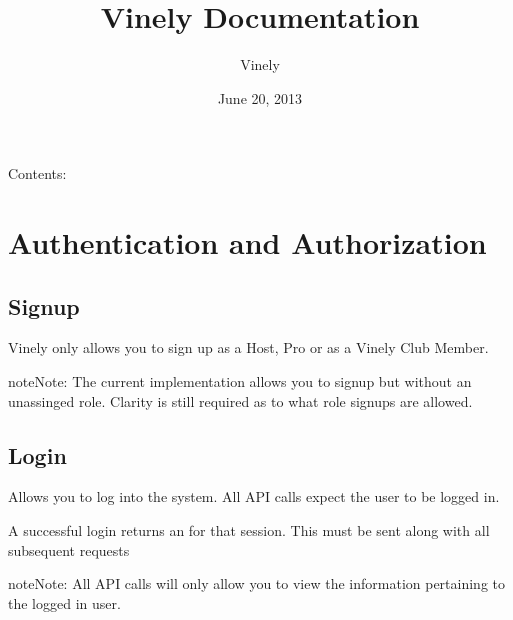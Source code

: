 \documentclass[letterpaper,10pt,english]{sphinxmanual}
\title{Vinely Documentation}
\date{June 20, 2013}
\author{Vinely}
\begin{document}
\maketitle
\tableofcontents
{}\label{index::doc}


Contents:


\chapter{Authentication and Authorization}
\label{auth:authentication-and-authorization}\label{auth:welcome-to-vinely-s-documentation}\label{auth::doc}\label{auth:ref-auth}

\section{Signup}
\label{auth:signup}
Vinely only allows you to sign up as a Host, Pro or as a Vinely Club Member.


\begin{fulllineitems}
\label{auth:post--api-v1-auth-signup-}
\end{fulllineitems}


\begin{notice}{note}{Note:}
The current implementation allows you to signup but without an unassinged role.
Clarity is still required as to what role signups are allowed.
\end{notice}


\section{Login}
\label{auth:login}
Allows you to log into the system. All API calls expect the user to be logged in.


\begin{fulllineitems}
\label{auth:post--api-v1-auth-login-}
\end{fulllineitems}


A successful login returns an  for that session. This  must be sent along with
all subsequent requests

\begin{notice}{note}{Note:}
All API calls will only allow you to view the information pertaining to the logged in user.
\end{notice}
\end{document}

